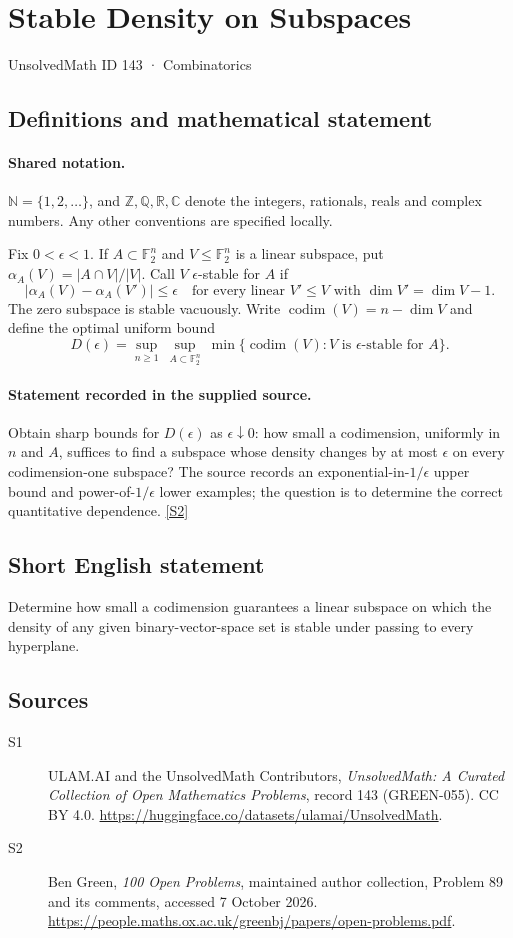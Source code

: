 \documentclass[11pt]{article}
\newcommand{\sref}[2]{\hyperlink{source:#1:#2}{[S#2]}}
\begin{document}
\setcounter{section}{142}
\section{Stable Density on Subspaces}\label{143}
{\small\sffamily UnsolvedMath ID 143 · Combinatorics}
\subsection{Definitions and mathematical statement}

\paragraph{Shared notation.}$\mathbb N=\{1,2,\ldots\}$, and $\mathbb Z,\mathbb Q,\mathbb R,\mathbb C$ denote the integers, rationals, reals and complex numbers. Any other conventions are specified locally.


Fix $0<\epsilon<1$. If $A\subset\mathbb F_2^n$ and $V\leq\mathbb F_2^n$ is a linear subspace, put $\alpha_A(V)=|A\cap V|/|V|$. Call $V$ $\epsilon$-stable for $A$ if
\[
 |\alpha_A(V)-\alpha_A(V')|\leq\epsilon
 \quad\text{for every linear }V'\leq V\text{ with }\dim V'=\dim V-1.
\]
The zero subspace is stable vacuously. Write $\operatorname{codim}(V)=n-\dim V$ and define the optimal uniform bound
\[
 D(\epsilon)=\sup_{n\geq1}\ \sup_{A\subset\mathbb F_2^n}\
 \min\{\operatorname{codim}(V):V\text{ is }\epsilon\text{-stable for }A\}.
\]
\paragraph{Statement recorded in the supplied source.}
Obtain sharp bounds for $D(\epsilon)$ as $\epsilon\downarrow0$: how small a codimension, uniformly in $n$ and $A$, suffices to find a subspace whose density changes by at most $\epsilon$ on every codimension-one subspace? The source records an exponential-in-$1/\epsilon$ upper bound and power-of-$1/\epsilon$ lower examples; the question is to determine the correct quantitative dependence. \sref{143}{2}
\subsection{Short English statement}
Determine how small a codimension guarantees a linear subspace on which the density of any given binary-vector-space set is stable under passing to every hyperplane.
\subsection{Sources}
\begin{description}
\item[\hypertarget{source:143:1}{S1}] ULAM.AI and the UnsolvedMath Contributors, \emph{UnsolvedMath: A Curated Collection of Open Mathematics Problems}, record 143 (GREEN-055). CC BY 4.0. \url{https://huggingface.co/datasets/ulamai/UnsolvedMath}.
\item[\hypertarget{source:143:2}{S2}] Ben Green, \emph{100 Open Problems}, maintained author collection, Problem 89 and its comments, accessed 7 October 2026. \url{https://people.maths.ox.ac.uk/greenbj/papers/open-problems.pdf}.
\end{description}
\label{end:143}
\end{document}
